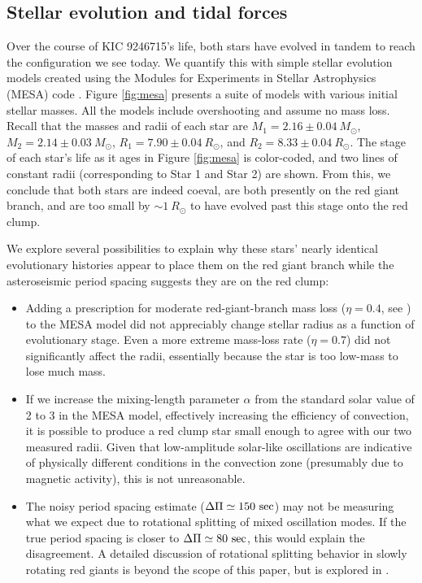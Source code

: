 \subsection{Stellar evolution and tidal forces}\label{tides}

Over the course of KIC 9246715's life, both stars have evolved in tandem to reach the configuration we see today. We quantify this with simple stellar evolution models created using the Modules for Experiments in Stellar Astrophysics (MESA) code \citep{pax11,pax13,pax15}. Figure \ref{fig:mesa} presents a suite of models with various initial stellar masses. All the models include overshooting and assume no mass loss. Recall that the masses and radii of each star are $M_1 = 2.16 \pm 0.04\ M_{\odot}$, $M_2 = 2.14 \pm 0.03\ M_{\odot}$, $R_1 = 7.90 \pm 0.04 \ R_{\odot}$, and $R_2 = 8.33 \pm 0.04 \ R_{\odot}$. The stage of each star's life as it ages in Figure \ref{fig:mesa} is color-coded, and two lines of constant radii (corresponding to Star 1 and Star 2) are shown. From this, we conclude that both stars are indeed coeval, are both presently on the red giant branch, and are too small by $\sim 1 \ R_\odot$ to have evolved past this stage onto the red clump.

We explore several possibilities to explain why these stars' nearly identical evolutionary histories appear to place them on the red giant branch while the asteroseismic period spacing suggests they are on the red clump:
\begin{itemize}
\item Adding a prescription for moderate red-giant-branch mass loss ($\eta = 0.4$, see \citet{mig12}) to the MESA model did not appreciably change stellar radius as a function of evolutionary stage. Even a more extreme mass-loss rate ($\eta = 0.7$) did not significantly affect the radii, essentially because the star is too low-mass to lose much mass.
\item If we increase the mixing-length parameter $\alpha$ from the standard solar value of 2 to 3 in the MESA model, effectively increasing the efficiency of convection, it is possible to produce a red clump star small enough to agree with our two measured radii. Given that low-amplitude solar-like oscillations are indicative of physically different conditions in the convection zone (presumably due to magnetic activity), this is not unreasonable.
\item The noisy period spacing estimate ($\Delta \Pi \simeq 150 \ \rm{sec}$) may not be measuring what we expect due to rotational splitting of mixed oscillation modes. If the true period spacing is closer to $\Delta \Pi \simeq 80 \ \rm{sec}$, this would explain the disagreement. A detailed discussion of rotational splitting behavior in slowly rotating red giants is beyond the scope of this paper, but is explored in \citet{gou13}.
\end{itemize}

  
  